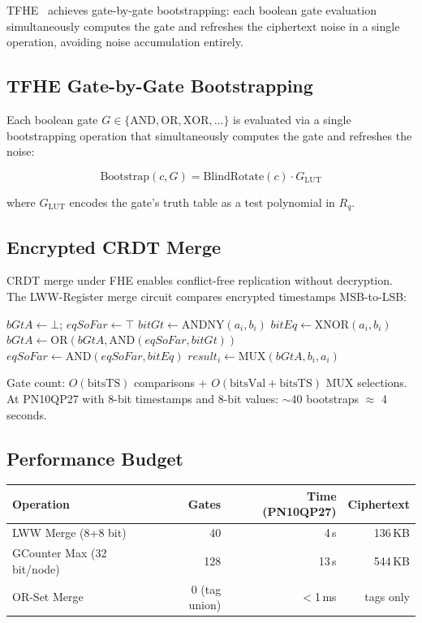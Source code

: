 \documentclass[11pt,a4paper]{article}
\begin{document}
TFHE~\cite{tfhe2016} achieves gate-by-gate bootstrapping: each
boolean gate evaluation simultaneously computes the gate and refreshes
the ciphertext noise in a single operation, avoiding noise
accumulation entirely.

\subsection{TFHE Gate-by-Gate Bootstrapping}

Each boolean gate $G \in \{\text{AND}, \text{OR}, \text{XOR}, \ldots\}$
is evaluated via a single bootstrapping operation that simultaneously
computes the gate and refreshes the noise:

\[
\text{Bootstrap}(c, G) = \text{BlindRotate}(c) \cdot G_{\text{LUT}}
\]

where $G_{\text{LUT}}$ encodes the gate's truth table as a test
polynomial in $R_q$.

\subsection{Encrypted CRDT Merge}

CRDT merge under FHE enables conflict-free replication without
decryption. The LWW-Register merge circuit compares encrypted
timestamps MSB-to-LSB:

\begin{algorithmic}[1]
\State $\mathit{bGtA} \gets \bot$; $\mathit{eqSoFar} \gets \top$
  \State $\mathit{bitGt} \gets \text{ANDNY}(a_i, b_i)$
  \State $\mathit{bitEq} \gets \text{XNOR}(a_i, b_i)$
  \State $\mathit{bGtA} \gets \text{OR}(\mathit{bGtA},
         \text{AND}(\mathit{eqSoFar}, \mathit{bitGt}))$
  \State $\mathit{eqSoFar} \gets \text{AND}(\mathit{eqSoFar},
         \mathit{bitEq})$
\EndFor
{}
  \State $\mathit{result}_i \gets \text{MUX}(\mathit{bGtA}, b_i, a_i)$
\EndFor
\end{algorithmic}

Gate count: $O(\text{bitsTS})$ comparisons + $O(\text{bitsVal} +
\text{bitsTS})$ MUX selections. At PN10QP27 with 8-bit timestamps
and 8-bit values: $\sim$40 bootstraps $\approx$ 4 seconds.

\subsection{Performance Budget}

\begin{center}
\begin{tabular}{lrrr}
\toprule
\textbf{Operation} & \textbf{Gates} & \textbf{Time (PN10QP27)} & \textbf{Ciphertext} \\
\midrule
LWW Merge (8+8 bit) & 40 & 4\,s & 136\,KB \\
GCounter Max (32 bit/node) & 128 & 13\,s & 544\,KB \\
OR-Set Merge & 0 (tag union) & $<$1\,ms & tags only \\
\bottomrule
\end{tabular}
\end{center}
\end{document}
